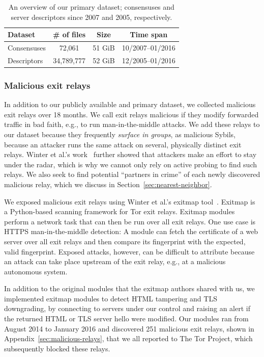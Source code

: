 \begin{table}[t]
\small
\centering
\begin{tabular}{l c c c}
\hline
\textbf{Dataset} & \textbf{\# of files} & \textbf{Size} & \textbf{Time span} \\
\hline
Consensuses & 72,061 & 51 GiB & 10/2007--01/2016 \\
Descriptors & 34,789,777 & 52 GiB & 12/2005--01/2016 \\
\hline
\end{tabular}
\caption{An overview of our primary dataset; consensuses and server descriptors
since 2007 and 2005, respectively.}
\label{tab:collector-dataset}
\end{table}

\subsubsection{Malicious exit relays}
In addition to our publicly available and primary dataset, we collected
malicious exit relays over 18 months.  We call exit relays malicious if they
modify forwarded traffic in bad faith, e.g., to run man-in-the-middle attacks.
We add these relays to our dataset because they frequently \emph{surface in
groups}, as malicious Sybils, because an attacker runs the same attack on
several, physically distinct exit relays.  Winter et al.'s work~\cite[\S
5.2]{Winter2014a} further showed that attackers make an effort to stay under the
radar, which is why we cannot only rely on active probing to find such relays.
We also seek to find potential ``partners in crime'' of each newly discovered
malicious relay, which we discuss in Section~\ref{sec:nearest-neighbor}.

We exposed malicious exit relays using Winter et al.'s exitmap tool~\cite[\S
3.1]{Winter2014a}.  Exitmap is a Python-based scanning framework for Tor exit
relays.  Exitmap modules perform a network task that can then be run over all
exit relays.  One use case is HTTPS man-in-the-middle detection: A module can
fetch the certificate of a web server over all exit relays and then compare its
fingerprint with the expected, valid fingerprint.  Exposed attacks, however, can
be difficult to attribute because an attack can take place upstream of the exit
relay, e.g., at a malicious autonomous system.

In addition to the original modules that the exitmap authors shared with us, we
implemented exitmap modules to detect HTML tampering and TLS downgrading, by
connecting to servers under our control and raising an alert if the returned
HTML or TLS server hello were modified.  Our modules ran from August 2014 to
January 2016 and discovered 251 malicious exit relays, shown in
Appendix~\ref{sec:malicious-relays}, that we all reported to The Tor Project,
which subsequently blocked these relays.

